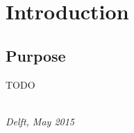 \chapter{Introduction}

\section{Purpose}
TODO
\begin{flushright}
{\makeatletter\itshape
    \@author \\
    Delft, May 2015
\makeatother}
\end{flushright}

